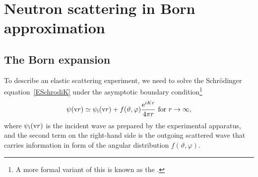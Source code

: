 %
%

\section{Neutron scattering in Born approximation}\label{SBornApprox}

\subsection{The Born expansion}\label{SBornExpans}

%
%

To describe an elastic scattering experiment,
we need to solve the Schrödinger equation~\cref{ESchrodiK}
under the asymptotic boundary condition\footnote
{A more formal variant of this is known as the .%
%
%
}
%
\begin{equation}\label{Escabouco}
  \psi(\text{v}{r})
  \simeq \psi_{\text{i}}(\text{v}{r}) + f(\vartheta,\varphi)\frac{\mathrm e^{iKr}}{4\pi r}
  \text{~for~}r\to\infty,
\end{equation}
%
%
%
where $\psi_{\text{i}}(\text{v}{r})$ is the incident wave
as prepared by the experimental apparatus,
and the second term on the right-hand side is
the outgoing scattered wave
that carries information in form of the angular distribution
$f(\vartheta,\varphi)$.

